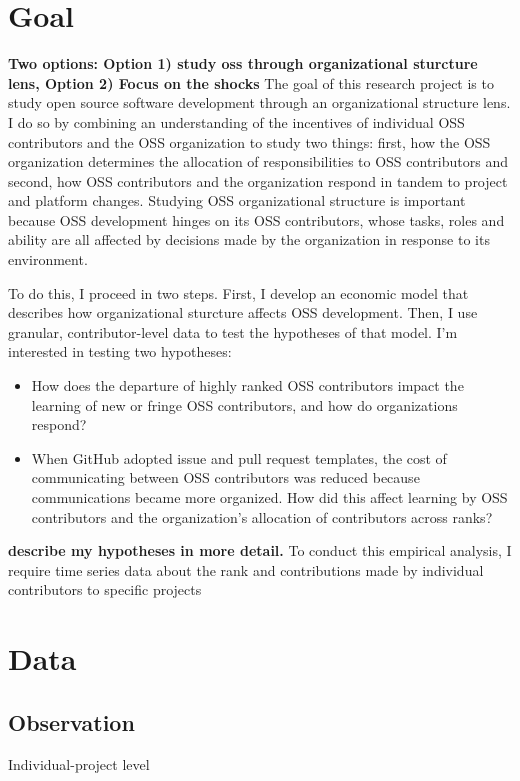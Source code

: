 \documentclass[12pt,notitlepage]{article}
\begin{document}
\section*{Goal}
\textbf{Two options: Option 1) study oss through organizational sturcture lens, Option 2) Focus on the shocks}
The goal of this research project is to study open source software development through an organizational structure lens. I do so by combining an understanding of the incentives of individual OSS contributors and the OSS organization to study two things: first, how the OSS organization determines the allocation of responsibilities to OSS contributors and second, how OSS contributors and the organization respond in tandem to project and platform changes. Studying OSS organizational structure is important because OSS development hinges on its OSS contributors, whose tasks, roles and ability are all affected by decisions made by the organization in response to its environment. 

To do this, I proceed in two steps. First, I develop an economic model that describes how organizational sturcture affects OSS development. Then, I use granular, contributor-level data to test the hypotheses of that model. I'm interested in testing two hypotheses:
\begin{itemize}
    \item How does the departure of highly ranked OSS contributors impact the learning of new or fringe OSS contributors, and how do organizations respond?
    \item When GitHub adopted issue and pull request templates, the cost of communicating between OSS contributors was reduced because communications became more organized. How did this affect learning by OSS contributors and the organization's allocation of contributors across ranks?
\end{itemize}
\textbf{describe my hypotheses in more detail. }
To conduct this empirical analysis, I require time series data about the rank and contributions made by individual contributors to specific projects 

\section*{Data}

\subsection*{Observation}
Individual-project level
\end{document}
